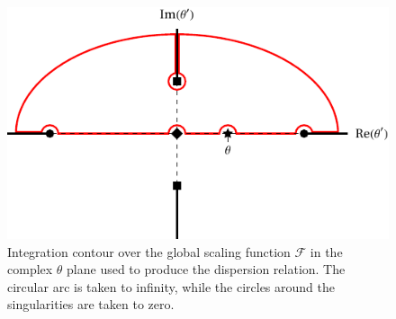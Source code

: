 \documentclass[
  aps,
  pre,
  reprint,
  longbibliography,
  floatfix
]{revtex4-2}
\begin{document}
\begin{figure}
  \includegraphics{figs/contour_path.pdf}
  \caption{
    Integration contour over the global scaling function $\mathcal F$ in the
    complex $\theta$ plane used to produce the dispersion relation. The
    circular arc is taken to infinity, while the circles around the
    singularities are taken to zero.
  } \label{fig:contour}
\end{figure}
\end{document}
